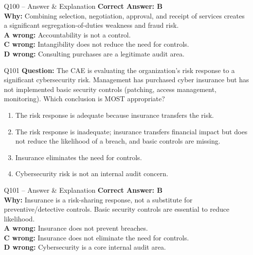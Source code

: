 \documentclass[aspectratio=169,10pt]{beamer}
\begin{document}
	\begin{frame}[t]{Q100 -- Answer \& Explanation}
		\small
		\textbf{Correct Answer: B} \\[4pt]
		\textbf{Why:} Combining selection, negotiation, approval, and receipt of services creates a significant segregation-of-duties weakness and fraud risk. \\[4pt]
		\textbf{A wrong:} Accountability is not a control. \\[2pt]
		\textbf{C wrong:} Intangibility does not reduce the need for controls. \\[2pt]
		\textbf{D wrong:} Consulting purchases are a legitimate audit area.
	\end{frame}
	
	\begin{frame}[t]{Q101}
		\small
		\textbf{Question:} The CAE is evaluating the organization's risk response to a significant cybersecurity risk. Management has purchased cyber insurance but has not implemented basic security controls (patching, access management, monitoring). Which conclusion is MOST appropriate?
		\begin{enumerate}[label=\Alph*.,itemsep=1pt,topsep=2pt]
			\item The risk response is adequate because insurance transfers the risk.
			\item The risk response is inadequate; insurance transfers financial impact but does not reduce the likelihood of a breach, and basic controls are missing.
			\item Insurance eliminates the need for controls.
			\item Cybersecurity risk is not an internal audit concern.
		\end{enumerate}
	\end{frame}
	
	\begin{frame}[t]{Q101 -- Answer \& Explanation}
		\small
		\textbf{Correct Answer: B} \\[4pt]
		\textbf{Why:} Insurance is a risk-sharing response, not a substitute for preventive/detective controls. Basic security controls are essential to reduce likelihood. \\[4pt]
		\textbf{A wrong:} Insurance does not prevent breaches. \\[2pt]
		\textbf{C wrong:} Insurance does not eliminate the need for controls. \\[2pt]
		\textbf{D wrong:} Cybersecurity is a core internal audit area.
	\end{frame}
	
\end{document}
